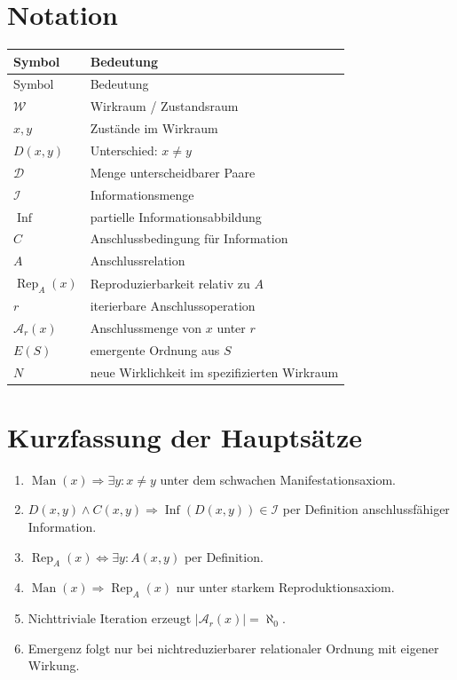 \documentclass[11pt,a4paper]{article}
\theoremstyle{remark}
\newcommand{\W}{\mathcal{W}}
\newcommand{\I}{\mathcal{I}}
\newcommand{\D}{\mathcal{D}}
\newcommand{\A}{\mathcal{A}}
\newcommand{\Inf}{\operatorname{Inf}}
\newcommand{\Man}{\operatorname{Man}}
\newcommand{\Rep}{\operatorname{Rep}}
\begin{document}
\section{Notation}
\begin{longtable}{>{\raggedright\arraybackslash}p{}p{}}
\toprule
Symbol & Bedeutung \\
\midrule
\endfirsthead
\toprule
Symbol & Bedeutung \\
\midrule
\endhead
$\W$ & Wirkraum / Zustandsraum \\
$x,y$ & Zustände im Wirkraum \\
$D(x,y)$ & Unterschied: $x\neq y$ \\
$\D$ & Menge unterscheidbarer Paare \\
$\I$ & Informationsmenge \\
$\Inf$ & partielle Informationsabbildung \\
$C$ & Anschlussbedingung für Information \\
$A$ & Anschlussrelation \\
$\Rep_A(x)$ & Reproduzierbarkeit relativ zu $A$ \\
$r$ & iterierbare Anschlussoperation \\
$\A_r(x)$ & Anschlussmenge von $x$ unter $r$ \\
$E(S)$ & emergente Ordnung aus $S$ \\
$N$ & neue Wirklichkeit im spezifizierten Wirkraum \\
\bottomrule
\end{longtable}

\section{Kurzfassung der Hauptsätze}
\begin{enumerate}
    \item $\Man(x)\Rightarrow \exists y:x\neq y$ unter dem schwachen Manifestationsaxiom.
    \item $D(x,y)\land C(x,y)\Rightarrow \Inf(D(x,y))\in\I$ per Definition anschlussfähiger Information.
    \item $\Rep_A(x)\Leftrightarrow \exists y:A(x,y)$ per Definition.
    \item $\Man(x)\Rightarrow \Rep_A(x)$ nur unter starkem Reproduktionsaxiom.
    \item Nichttriviale Iteration erzeugt $|\A_r(x)|=\aleph_0$.
    \item Emergenz folgt nur bei nichtreduzierbarer relationaler Ordnung mit eigener Wirkung.
\end{enumerate}

\printbibliography
\end{document}
